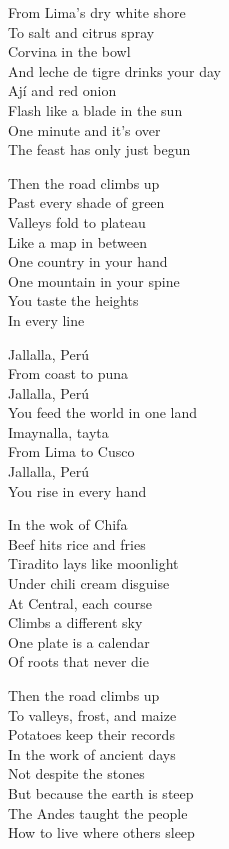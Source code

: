 \begin{lyrics}
From Lima's dry white shore\\
To salt and citrus spray\\
Corvina in the bowl\\
And leche de tigre drinks your day\\
Ají and red onion\\
Flash like a blade in the sun\\
One minute and it's over\\
The feast has only just begun

Then the road climbs up\\
Past every shade of green\\
Valleys fold to plateau\\
Like a map in between\\
One country in your hand\\
One mountain in your spine\\
You taste the heights\\
In every line

Jallalla, Perú\\
From coast to puna\\
Jallalla, Perú\\
You feed the world in one land\\
Imaynalla, tayta\\
From Lima to Cusco\\
Jallalla, Perú\\
You rise in every hand

In the wok of Chifa\\
Beef hits rice and fries\\
Tiradito lays like moonlight\\
Under chili cream disguise\\
At Central, each course\\
Climbs a different sky\\
One plate is a calendar\\
Of roots that never die

Then the road climbs up\\
To valleys, frost, and maize\\
Potatoes keep their records\\
In the work of ancient days\\
Not despite the stones\\
But because the earth is steep\\
The Andes taught the people\\
How to live where others sleep


\end{lyrics}
